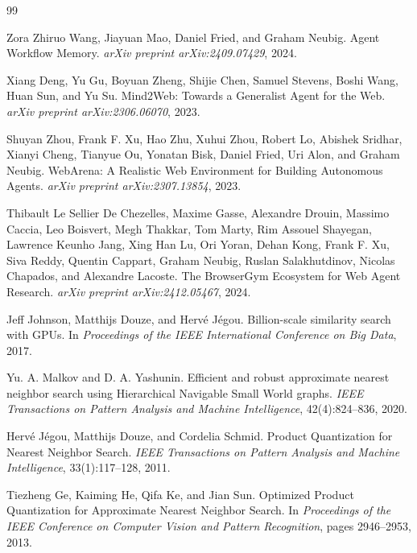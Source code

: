 \documentclass[11pt]{article}
\begin{document}
\begin{thebibliography}{99}

Zora Zhiruo Wang, Jiayuan Mao, Daniel Fried, and Graham Neubig.
\newblock Agent Workflow Memory.
\newblock \emph{arXiv preprint arXiv:2409.07429}, 2024.

Xiang Deng, Yu Gu, Boyuan Zheng, Shijie Chen, Samuel Stevens, Boshi Wang, Huan Sun, and Yu Su.
\newblock Mind2Web: Towards a Generalist Agent for the Web.
\newblock \emph{arXiv preprint arXiv:2306.06070}, 2023.

Shuyan Zhou, Frank F. Xu, Hao Zhu, Xuhui Zhou, Robert Lo, Abishek Sridhar, Xianyi Cheng, Tianyue Ou, Yonatan Bisk, Daniel Fried, Uri Alon, and Graham Neubig.
\newblock WebArena: A Realistic Web Environment for Building Autonomous Agents.
\newblock \emph{arXiv preprint arXiv:2307.13854}, 2023.

Thibault Le Sellier De Chezelles, Maxime Gasse, Alexandre Drouin, Massimo Caccia, Leo Boisvert, Megh Thakkar, Tom Marty, Rim Assouel Shayegan, Lawrence Keunho Jang, Xing Han Lu, Ori Yoran, Dehan Kong, Frank F. Xu, Siva Reddy, Quentin Cappart, Graham Neubig, Ruslan Salakhutdinov, Nicolas Chapados, and Alexandre Lacoste.
\newblock The BrowserGym Ecosystem for Web Agent Research.
\newblock \emph{arXiv preprint arXiv:2412.05467}, 2024.

Jeff Johnson, Matthijs Douze, and Herv\'e J\'egou.
\newblock Billion-scale similarity search with GPUs.
\newblock In \emph{Proceedings of the IEEE International Conference on Big Data}, 2017.

Yu. A. Malkov and D. A. Yashunin.
\newblock Efficient and robust approximate nearest neighbor search using Hierarchical Navigable Small World graphs.
\newblock \emph{IEEE Transactions on Pattern Analysis and Machine Intelligence}, 42(4):824--836, 2020.

Herv\'e J\'egou, Matthijs Douze, and Cordelia Schmid.
\newblock Product Quantization for Nearest Neighbor Search.
\newblock \emph{IEEE Transactions on Pattern Analysis and Machine Intelligence}, 33(1):117--128, 2011.

Tiezheng Ge, Kaiming He, Qifa Ke, and Jian Sun.
\newblock Optimized Product Quantization for Approximate Nearest Neighbor Search.
\newblock In \emph{Proceedings of the IEEE Conference on Computer Vision and Pattern Recognition}, pages 2946--2953, 2013.


\end{thebibliography}
\end{document}
